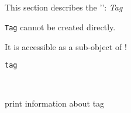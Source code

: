 
\subsection{}

This section describes the '': \textsl{Tag}

\begin{description}
\vspace{3mm}  \item[Creation:] \texttt{Tag} cannot be created directly.\

It is accessible as a sub-object of !

\vspace{3mm} \item[Methods:] \texttt{tag}

    \begin{description}
       \texttt{} \

        print information about tag

    \end{description}

\end{description}

